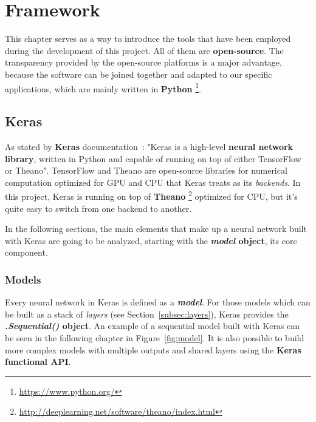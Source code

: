 \chapter{Framework}\label{ch:framework}
This chapter serves as a way to introduce the tools that have been employed during the development of this project. All of them are \textbf{open-source}. The transparency provided by the open-source platforms is a major advantage, because the software can be joined together and adapted to our specific applications, which are mainly written in \textbf{Python} \footnote{\url{https://www.python.org/}}.

\section{Keras}\label{sec:keras}
As stated by \textbf{Keras} documentation~\cite{chollet2015keras}: "Keras is a high-level \textbf{neural network library}, written in Python and capable of running on top of either TensorFlow or Theano". TensorFlow and Theano are open-source libraries for numerical computation optimized for GPU and CPU that Keras treats as its \textit{backends}. In this project, Keras is running on top of \textbf{Theano} \footnote{\url{http://deeplearning.net/software/theano/index.html}} optimized for CPU, but it's quite easy to switch from one backend to another.

In the following sections, the main elements that make up a neural network built with Keras are going to be analyzed, starting with the \textbf{\textit{model} object}, its core component.

\subsection{Models}\label{subsec:models}
Every neural network in Keras is defined as a \textbf{\textit{model}}. For those models which can be built as a stack of \textit{layers} (see Section~\ref{subsec:layers}), Keras provides the \textbf{\textit{.Sequential()} object}. An example of a sequential model built with Keras can be seen in the following chapter in Figure~\ref{fig:model}. It is also possible to build more complex models with multiple outputs and shared layers using the \textbf{Keras functional API}.

